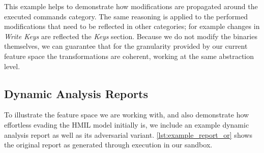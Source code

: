 This example helps to demonstrate how modifications are propagated around the executed commands category. The same reasoning is applied to the performed modifications that need to be reflected in other categories; for example changes in \textit{Write Keys} are reflected the \textit{Keys} section.
Because we do not modify the binaries themselves, we can guarantee that for the granularity provided by our current feature space the transformations are coherent, working at the same abstraction level.

\subsection{Dynamic Analysis Reports}
\label{app:poc_report}
To illustrate the feature space we are working with, and also demonstrate how effortless evading the HMIL model initially is, we include an example dynamic analysis report as well as its adversarial variant.
\autoref{lst:example_report_or} shows the original report as generated through execution in our sandbox.

